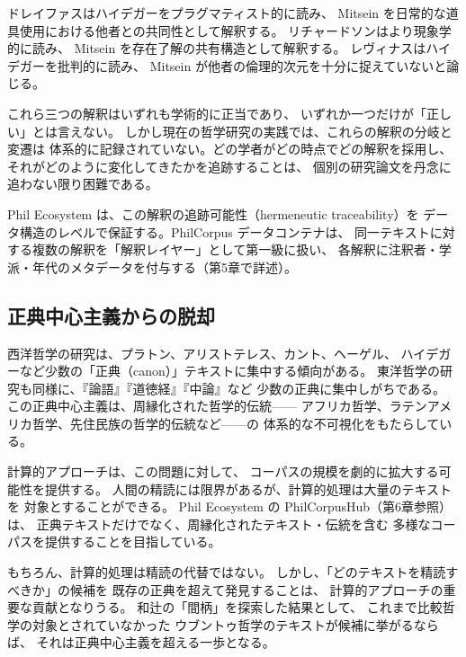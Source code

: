 \documentclass[a4paper,11pt]{ltjsarticle}
\begin{document}
ドレイファスはハイデガーをプラグマティスト的に読み、
Mitsein を日常的な道具使用における他者との共同性として解釈する\cite{dreyfus1991}。
リチャードソンはより現象学的に読み、
Mitsein を存在了解の共有構造として解釈する\cite{richardson1963}。
レヴィナスはハイデガーを批判的に読み、
Mitsein が他者の倫理的次元を十分に捉えていないと論じる\cite{levinas1969}。

これら三つの解釈はいずれも学術的に正当であり、
いずれか一つだけが「正しい」とは言えない。
しかし現在の哲学研究の実践では、これらの解釈の分岐と変遷は
体系的に記録されていない。どの学者がどの時点でどの解釈を採用し、
それがどのように変化してきたかを追跡することは、
個別の研究論文を丹念に追わない限り困難である。

Phil Ecosystem は、この解釈の追跡可能性（hermeneutic traceability）を
データ構造のレベルで保証する。PhilCorpus データコンテナは、
同一テキストに対する複数の解釈を「解釈レイヤー」として第一級に扱い、
各解釈に注釈者・学派・年代のメタデータを付与する（第5章で詳述）。

\subsection{正典中心主義からの脱却}

西洋哲学の研究は、プラトン、アリストテレス、カント、ヘーゲル、
ハイデガーなど少数の「正典（canon）」テキストに集中する傾向がある。
東洋哲学の研究も同様に、『論語』『道徳経』『中論』など
少数の正典に集中しがちである。
この正典中心主義は、周縁化された哲学的伝統——
アフリカ哲学、ラテンアメリカ哲学、先住民族の哲学的伝統など——の
体系的な不可視化をもたらしている。

計算的アプローチは、この問題に対して、
コーパスの規模を劇的に拡大する可能性を提供する。
人間の精読には限界があるが、計算的処理は大量のテキストを
対象とすることができる。
Phil Ecosystem の PhilCorpusHub（第6章参照）は、
正典テキストだけでなく、周縁化されたテキスト・伝統を含む
多様なコーパスを提供することを目指している。

もちろん、計算的処理は精読の代替ではない。
しかし、「どのテキストを精読すべきか」の候補を
既存の正典を超えて発見することは、
計算的アプローチの重要な貢献となりうる。
和辻の「間柄」を探索した結果として、
これまで比較哲学の対象とされていなかった
ウブントゥ哲学のテキストが候補に挙がるならば、
それは正典中心主義を超える一歩となる。


\end{document}
